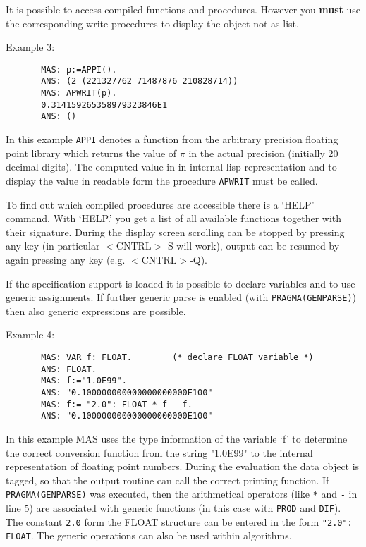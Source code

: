 It is possible to access compiled functions and procedures.
However you {\bf must} use the corresponding 
write procedures to display the object not as 
list.

Example 3:
\begin{verbatim}
       MAS: p:=APPI().  
       ANS: (2 (221327762 71487876 210828714)) 
       MAS: APWRIT(p).  
       0.314159265358979323846E1 
       ANS: ()          
\end{verbatim}

In this example \verb/APPI/ denotes a function from
the arbitrary precision floating point library which returns
the value of $\pi$ in the actual precision 
(initially 20 decimal digits). 
The computed value in in internal lisp representation and 
to display the value in readable form the 
procedure \verb/APWRIT/ must be called.

To find out which compiled procedures are accessible there is a
`HELP' command.
With `HELP.' you get a list of all available functions
together with their signature.
During the display
screen scrolling can be stopped by pressing any key 
(in particular $<$CNTRL$>$-S will work), 
output can be resumed by
again pressing any key (e.g. $<$CNTRL$>$-Q).

If the specification support is loaded it is 
possible to declare variables 
and to use generic assignments.
If further generic parse is enabled (with \verb/PRAGMA(GENPARSE)/)
then also generic expressions are possible.

Example 4:
\begin{verbatim}
       MAS: VAR f: FLOAT.        (* declare FLOAT variable *)
       ANS: FLOAT.                 
       MAS: f:="1.0E99".      
       ANS: "0.100000000000000000000E100"
       MAS: f:= "2.0": FLOAT * f - f.         
       ANS: "0.100000000000000000000E100"
\end{verbatim}

In this example MAS uses the type information of the variable `f' 
to determine the correct conversion
function from the string "1.0E99" to the internal representation
of floating point numbers. 
During the evaluation the data object
is tagged, so that the output 
routine can call the correct printing function.
If \verb/PRAGMA(GENPARSE)/ was executed, then 
the arithmetical operators (like \verb/*/ and \verb/-/ 
in line 5) are associated with generic functions 
(in this case with \verb/PROD/ and \verb/DIF/).
The constant \verb/2.0/ form the FLOAT structure can be entered 
in the form \verb/"2.0": FLOAT/.
The generic operations can also be used within 
algorithms.


